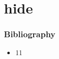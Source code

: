\section*{hide}

\begin{frame}%
\frametitle{Bibliography}

\begin{itemize}
  \item 11
\end{itemize}

\end{frame}